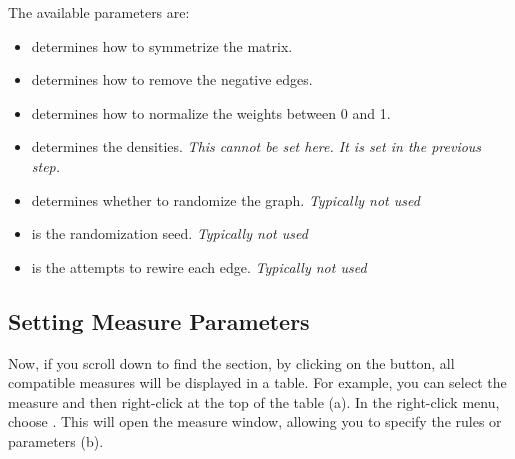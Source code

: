 \documentclass[justified]{tufte-handout}
\begin{document}
The available parameters are:
\begin{itemize}

\item {} determines how to symmetrize the matrix.

\item {} determines how to remove the negative edges.

\item {} determines how to normalize the weights between 0 and 1.

\item {} determines the densities. \emph{This cannot be set here. It is set in the previous step.}

\item {} determines whether to randomize the graph. \emph{Typically not used}

\item {} is the randomization seed. \emph{Typically not used}

\item {} is the attempts to rewire each edge. \emph{Typically not used}

\end{itemize}

\subsection{Setting Measure Parameters}

Now, if you scroll down to find the  section, by clicking on the  button, all compatible measures will be displayed in a table. 
For example, you can select the  measure and then right-click at the top of the table (a). 
In the right-click menu, choose . 
This will open the measure window, allowing you to specify the rules or parameters (b).
\end{document}
